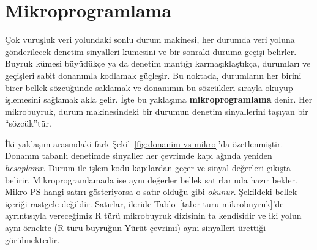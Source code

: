 
\section{Mikroprogramlama}
\label{sec:mikroprogramlama}

Çok vuruşluk veri yolundaki sonlu durum makinesi, her durumda veri yoluna gönderilecek denetim sinyalleri kümesini ve bir sonraki duruma geçişi belirler. Buyruk kümesi büyüdükçe ya da denetim mantığı karmaşıklaştıkça, durumları ve geçişleri sabit donanımla kodlamak güçleşir. Bu noktada, durumların her birini birer bellek sözcüğünde saklamak ve donanımın bu sözcükleri sırayla okuyup işlemesini sağlamak akla gelir. İşte bu yaklaşıma \textbf{mikroprogramlama} denir. Her mikrobuyruk, durum makinesindeki bir durumun denetim sinyallerini taşıyan bir ``sözcük''tür.

İki yaklaşım arasındaki fark Şekil~\ref{fig:donanim-vs-mikro}'da özetlenmiştir. Donanım tabanlı denetimde sinyaller her çevrimde kapı ağında yeniden \emph{hesaplanır}. Durum ile işlem kodu kapılardan geçer ve sinyal değerleri çıkışta belirir. Mikroprogramlamada ise aynı değerler bellek satırlarında hazır bekler. Mikro-PS hangi satırı gösteriyorsa o satır olduğu gibi \emph{okunur}. Şekildeki bellek içeriği rastgele değildir. Satırlar, ileride Tablo~\ref{tab:r-turu-mikrobuyruk}'de ayrıntısıyla vereceğimiz R türü mikrobuyruk dizisinin ta kendisidir ve iki yolun aynı örnekte (R türü buyruğun Yürüt çevrimi) aynı sinyalleri ürettiği görülmektedir.

